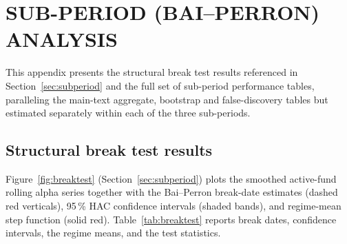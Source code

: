\documentclass[12pt, oneside]{report}
\begin{document}
\chapter{SUB-PERIOD (BAI--PERRON) ANALYSIS}
\label{app:subperiod}

\noindent This appendix presents the structural break test results
referenced in Section~\ref{sec:subperiod} and the full set of sub-period
performance tables, paralleling the main-text aggregate, bootstrap and
false-discovery tables but estimated separately within each of the three
sub-periods.

\section{Structural break test results}
\label{sec:break_test_results}

\noindent Figure~\ref{fig:breaktest} (Section~\ref{sec:subperiod}) plots the smoothed active-fund
rolling alpha series together with the Bai--Perron break-date
estimates (dashed red verticals), 95\,\% HAC confidence intervals
(shaded bands), and regime-mean step function (solid red).
Table~\ref{tab:breaktest} reports break dates, confidence intervals,
the regime means, and the test statistics.
\end{document}
